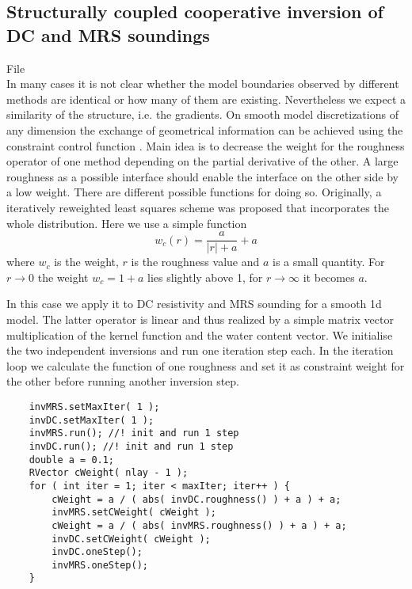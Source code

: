 \subsection{Structurally coupled cooperative inversion of DC and MRS soundings}\label{sec:structjoint}
File \\
In many cases it is not clear whether the model boundaries observed by different methods are identical or how many of them are existing.
Nevertheless we expect a similarity of the structure, i.e. the gradients.
On smooth model discretizations of any dimension the exchange of geometrical information can be achieved using the constraint control function \citep{guerue06nearsurface}.
Main idea is to decrease the weight for the roughness operator of one method depending on the partial derivative of the other.
A large roughness as a possible interface should enable the interface on the other side by a low weight.
There are different possible functions for doing so.
Originally, a iteratively reweighted least squares scheme was proposed that incorporates the whole distribution.
Here we use a simple function
\begin{equation}
    w_c(r) = \frac{a}{|r|+a}+a
\end{equation}
where $w_c$ is the weight, $r$ is the roughness value and $a$ is a small quantity.
For $r\rightarrow 0$ the weight $w_c=1+a$ lies slightly above 1, for $r\rightarrow\infty$ it becomes $a$.

In this case we apply it to DC resistivity and MRS sounding for a smooth 1d model.
The latter operator is linear and thus realized by a simple matrix vector multiplication of the kernel function and the water content vector.
We initialise the two independent inversions and run one iteration step each.
In the iteration loop we calculate the function of one roughness and set it as constraint weight for the other before running another inversion step.
\begin{lstlisting}
    invMRS.setMaxIter( 1 );
    invDC.setMaxIter( 1 );
    invMRS.run(); //! init and run 1 step
    invDC.run(); //! init and run 1 step
    double a = 0.1;
    RVector cWeight( nlay - 1 );
    for ( int iter = 1; iter < maxIter; iter++ ) {
        cWeight = a / ( abs( invDC.roughness() ) + a ) + a;
        invMRS.setCWeight( cWeight );
        cWeight = a / ( abs( invMRS.roughness() ) + a ) + a;
        invDC.setCWeight( cWeight );
        invDC.oneStep();
        invMRS.oneStep();
    }
\end{lstlisting}

